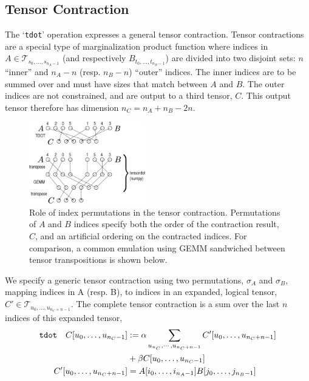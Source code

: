 \documentclass{sigplanconf}
\begin{document}
\subsection{ Tensor Contraction}

  The `{\tt tdot}' operation expresses a general tensor contraction.  Tensor
contractions are a special type of marginalization product function\cite{mpf} where
indices in $A \in \mathcal T_{s_0,\ldots,s_{n_A-1}}$ (and respectively $B_{t_0,\ldots,t_{n_B-1}}$)
are divided into two disjoint sets: $n$ ``inner'' and $n_A - n$ (resp. $n_B-n$) ``outer'' indices.
The inner indices are to be summed over and must have sizes that
match between $A$ and $B$.  The outer indices are not constrained,
and are output to a third tensor, $C$.  This output tensor therefore has dimension
$n_C = n_A + n_B - 2 n$.

\begin{figure}
\includegraphics[width=0.45\textwidth]{contr.eps}
\caption{Role of index permutations in the tensor contraction.
Permutations of $A$ and $B$ indices specify both the order of the
contraction result, $C$, and an artificial ordering on the contracted indices.
For comparison, a common emulation using GEMM sandwiched between tensor
transpositions is shown below.}\label{f:contr}
\end{figure}

  We specify a generic tensor contraction using two permutations,
$\sigma_A$ and $\sigma_B$, mapping indices in A (resp. B), to indices in
an expanded, logical tensor, $C' \in \mathcal T_{u_0, \ldots, u_{n_C+n-1}}$.
The complete tensor contraction is a sum over the last $n$ indices of this expanded
tensor,
\begin{align}
\text{\tt{tdot}} \quad C[u_0,\ldots,u_{n_C-1}] &:= \alpha \sum_{u_{n_C}, \cdots, u_{n_C+n-1}} C'[u_0,\ldots,u_{n_C+n-1}]  \notag \\
 & + \beta C[u_0,\ldots,u_{n_C-1}] \\
 C'[u_0,\ldots,u_{n_C+n-1}] &= A[i_0,\ldots,i_{n_A-1}] B[j_0,\ldots,j_{n_B-1}]
\end{align}
\end{document}

